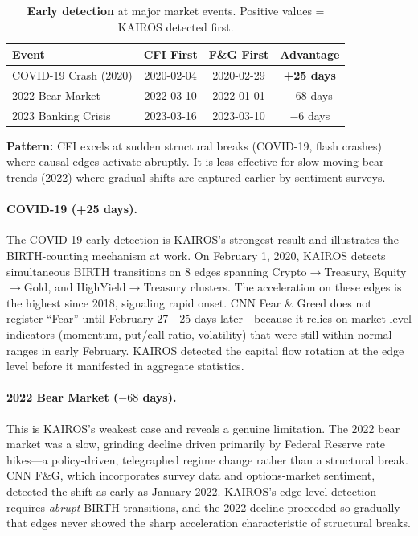 \documentclass[11pt]{article}
\begin{document}
\begin{table}[t]
\centering
\caption{\textbf{Early detection} at major market events. Positive values = KAIROS detected first.}
\label{tab:early}
\small
\begin{tabular}{lccc}
\toprule
\textbf{Event} & \textbf{CFI First} & \textbf{F\&G First} & \textbf{Advantage} \\
\midrule
COVID-19 Crash (2020)   & 2020-02-04 & 2020-02-29 & \textbf{+25 days} \\
2022 Bear Market        & 2022-03-10 & 2022-01-01 & $-68$ days \\
2023 Banking Crisis     & 2023-03-16 & 2023-03-10 & $-6$ days \\
\bottomrule
\end{tabular}
\end{table}

\textbf{Pattern:} CFI excels at sudden structural breaks (COVID-19, flash crashes) where causal edges activate abruptly. It is less effective for slow-moving bear trends (2022) where gradual shifts are captured earlier by sentiment surveys.

\paragraph{COVID-19 (+25 days).} The COVID-19 early detection is KAIROS's strongest result and illustrates the BIRTH-counting mechanism at work. On February 1, 2020, KAIROS detects simultaneous BIRTH transitions on 8 edges spanning Crypto$\to$Treasury, Equity$\to$Gold, and HighYield$\to$Treasury clusters. The acceleration on these edges is the highest since 2018, signaling rapid onset. CNN Fear \& Greed does not register ``Fear'' until February 27---25 days later---because it relies on market-level indicators (momentum, put/call ratio, volatility) that were still within normal ranges in early February. KAIROS detected the capital flow rotation at the edge level before it manifested in aggregate statistics.


\paragraph{2022 Bear Market ($-68$ days).} This is KAIROS's weakest case and reveals a genuine limitation. The 2022 bear market was a slow, grinding decline driven primarily by Federal Reserve rate hikes---a policy-driven, telegraphed regime change rather than a structural break. CNN F\&G, which incorporates survey data and options-market sentiment, detected the shift as early as January 2022. KAIROS's edge-level detection requires \emph{abrupt} BIRTH transitions, and the 2022 decline proceeded so gradually that edges never showed the sharp acceleration characteristic of structural breaks.
\end{document}
